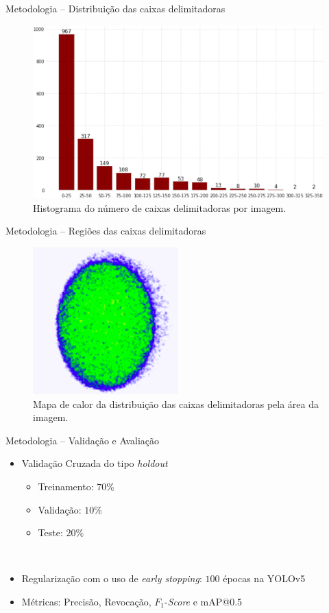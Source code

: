 \begin{frame}{Metodologia -- Distribuição das caixas delimitadoras}
\begin{figure}[H]
    \centering
    \includegraphics[width=0.65\linewidth]{./img/histogram.png}
    \caption{Histograma do número de caixas delimitadoras por imagem.}
    \label{fig:histogram}
\end{figure}
\end{frame}

\begin{frame}{Metodologia -- Regiões das caixas delimitadoras}
\begin{figure}[H]
    \centering
    \includegraphics[width=0.5\textwidth,height=0.375\textwidth]{./img/heat-map.png}
    \caption{Mapa de calor da distribuição das caixas delimitadoras pela área da imagem.}
    \label{fig:heat-map}
\end{figure}
\end{frame}

\begin{frame}{Metodologia --  Validação e Avaliação}
\begin{itemize}
\item Validação Cruzada do tipo \alert{\emph{holdout}}
\begin{itemize}
    \item Treinamento: $70\%$
    \item Validação: $10\%$
    \item Teste: $20\%$
\end{itemize}
\ \ \newline
\item Regularização com o uso de \alert{\emph{early stopping}: $100$ épocas} na YOLOv5
\item \alert{Métricas}: Precisão, Revocação, $F_1$-\emph{Score} e mAP@0.5
\end{itemize}
\end{frame}

